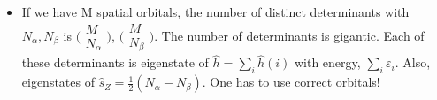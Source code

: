 \documentclass[a4paper, 12pt]{article}
\begin{document}
\begin{itemize}
	\item If we have M spatial orbitals, the number of distinct determinants with $N_\alpha, N_\beta$ is $\bigl(\begin{smallmatrix} M \\ N_\alpha \end{smallmatrix}\bigr)$, $\bigl(\begin{smallmatrix} M \\ N_\beta \end{smallmatrix}\bigr)$. The number of determinants is gigantic. Each of these determinants is eigenstate of $\hat{h} = \sum_i \hat{h}(i)$ with energy, $\sum_i \varepsilon_i$. Also, eigenstates of $\hat{s}_Z = \frac{1}{2} (N_\alpha - N_\beta)$. One has to use correct orbitals!\\
	

\end{itemize}
\end{document}
